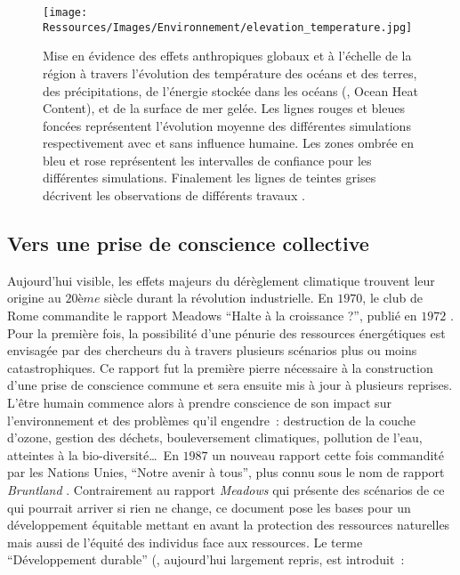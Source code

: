 \begin{figure}
    \centering
    \texttt{[image: Ressources/Images/Environnement/elevation\_temperature.jpg]}
    \caption[Mise en évidence des effets anthropiques globaux et à l’échelle de la région]
            {Mise en évidence des effets anthropiques globaux et à l’échelle de la région
             à travers l’évolution des température des océans et des terres, des précipitations,
             de l’énergie stockée dans les océans (, Ocean Heat Content), et
             de la surface de mer gelée. Les lignes rouges et bleues foncées représentent l’évolution moyenne
             des différentes simulations respectivement avec et sans influence humaine. Les zones
             ombrée en bleu et rose représentent les intervalles de confiance pour les différentes
             simulations. Finalement les lignes de teintes grises décrivent les observations
             de différents travaux \parencite{AchutaRao2013}.}
    \label{fig:evolution_climat}
\end{figure}

\subsection{Vers une prise de conscience collective} %
\label{sub:vers_une_prise_de_conscience_collective}
Aujourd’hui visible, les effets majeurs du dérèglement climatique trouvent leur origine au
$20ème$ siècle durant la révolution industrielle. En $1970$, le club de Rome commandite le
rapport Meadows \enquote{Halte à la croissance ?}, publié en $1972$
\parencite{Meadows1972}. Pour la première fois, la possibilité d’une pénurie des
ressources énergétiques est envisagée par des chercheurs du  à travers plusieurs
scénarios plus ou moins catastrophiques. Ce rapport fut la première pierre nécessaire à la
construction d’une prise de conscience commune et sera ensuite mis à jour à plusieurs
reprises. L’être humain commence alors à prendre conscience de son impact sur
l’environnement et des problèmes qu’il engendre~: destruction de la couche d’ozone,
gestion des déchets, bouleversement climatiques, pollution de l’eau, atteintes à la
bio-diversité\dots\ En $1987$ un nouveau rapport cette fois commandité par les Nations Unies,
\enquote{Notre avenir à tous}, plus connu sous le nom de rapport \textit{Bruntland} \parencite{Brundtland1987}.
Contrairement au rapport \textit{Meadows} qui présente des scénarios de ce qui pourrait
arriver si rien ne change, ce document pose les bases pour un développement équitable
mettant en avant la protection des ressources naturelles mais aussi de l’équité des
individus face aux ressources. Le terme \enquote{Développement durable} (,
aujourd’hui largement repris, est introduit~:

